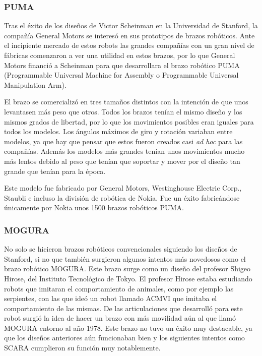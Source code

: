 \subsubsection{PUMA}

Tras el éxito de los diseños de Victor Scheinman en la Universidad de Stanford, la compañía General Motors se interesó en sus prototipos de brazos robóticos. Ante el incipiente mercado de estos robots las grandes compañías con un gran nivel de fábricas comenzaron a ver una utilidad en estos brazos, por lo que General Motors financió a Scheinman para que desarrollara el brazo robótico PUMA (Programmable Universal Machine for Assembly o Programmable Universal Manipulation Arm).

El brazo se comercializó en tres tamaños distintos con la intención de que unos levantasen más peso que otros. Todos los brazos tenían el mismo diseño y los mismos grados de libertad, por lo que los movimientos posibles eran iguales para todos los modelos. Los ángulos máximos de giro y rotación variaban entre modelos, ya que hay que pensar que estos fueron creados casi \textit{ad hoc} para las compañías. Además los modelos más grandes tenían unos movimientos mucho más lentos debido al peso que tenían que soportar y mover por el diseño tan grande que tenían para la época.

Este modelo fue fabricado por General Motors, Westinghouse Electric Corp., Staubli e incluso la división de robótica de Nokia. Fue un éxito fabricándose únicamente por Nokia unos 1500 brazos robóticos PUMA.

\subsubsection{MOGURA}

No solo se hicieron brazos robóticos convencionales siguiendo los diseños de Stanford, si no que también surgieron algunos intentos más novedosos como el brazo robótico MOGURA. Este brazo surge como un diseño del profesor Shigeo Hirose, del Instituto Tecnológico de Tokyo. El profesor Hirose estaba estudiando robots que imitaran el comportamiento de animales, como por ejemplo las serpientes, con las que ideó un robot llamado ACMVI que imitaba el comportamiento de las mismas. De las articulaciones que desarrolló para este robot surgió la idea de hacer un brazo con más movilidad aún al que llamó MOGURA entorno al año 1978. Este brazo no tuvo un éxito muy destacable, ya que los diseños anteriores aún funcionaban bien y los siguientes intentos como SCARA cumplieron su función muy notablemente.

